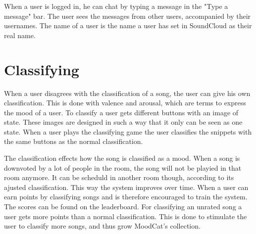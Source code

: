 When a user is logged in, he can chat by typing a message in the "Type a message" bar.
The user sees the messages from other users, accompanied by their usernames.
The name of a user is the name a user has set in SoundCloud as their real name.

\section{Classifying}
When a user disagrees with the classification of a song, the user can give his own classification.
This is done with valence and arousal, which are terms to express the mood of a user.
To classify a user gets different buttons with an image of state.
These images are designed in such a way that it only can be seen as one state.
When a user plays the classifying game the user classifies the snippets with the same buttons as the normal classification.

\par
The classification effects how the song is classified as a mood. When a song is downvoted by a lot of people in the room, the song will not be playied in that room anymore.
It can be scheduld in another room though, according to its  ajusted classification.
This way the system improves over time.
When a user can earn points by classifying songs and is therefore encouraged to train the system.
The scores can be found on the leaderboard. 
For classifying an unrated song a user gets more points than a normal classification.   
This is done to stimulate the user to classify more songs, and thus grow MoodCat's collection.
